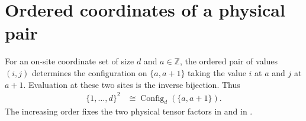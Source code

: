 \section{Ordered coordinates of a physical pair}
\label{sec:qca_consecutive_pair_coordinates}

\begin{definition}
    \label{def:qca_consecutive_pair_coordinates}
    \leanok
    For an on-site coordinate set of size $d$ and $a\in\mathbb Z$, the
    ordered pair of values $(i,j)$ determines the configuration on
    $\{a,a+1\}$ taking the value $i$ at $a$ and $j$ at $a+1$. Evaluation
    at these two sites is the inverse bijection. Thus
    \begin{align}
        \{1,\ldots,d\}^2 & \cong
        \operatorname{Config}_d(\{a,a+1\}).
    \end{align}
    The increasing order fixes the two physical tensor factors in
    \cite[equation~RR2x, lines~1251--1266]{Gross2012IndexTheory} and in
    \cite[equations~bruleU and bruleV, lines~980--1001]{SchumacherWerner2004QCA}.
\end{definition}
